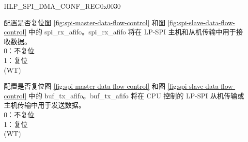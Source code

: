 \begin{register}{H}{LP\_SPI\_DMA\_CONF\_REG}{0x0030}\label{regdesc:LPSPIDMACONFREG}
%
%
%
%
\regnewline%
\begin{regdesc}\begin{reglist}
\label{fielddesc:LPSPIRXAFIFORST}\item [LP\_SPI\_RX\_AFIFO\_RST] 配置是否复位图 \ref{fig:spi-master-data-flow-control} 和图 \ref{fig:spi-slave-data-flow-control} 中的 spi\_rx\_afifo。spi\_rx\_afifo 将在 LP-SPI 主机和从机传输中用于接收数据。 \\
0：不复位\\
1：复位 \\
(WT)
\label{fielddesc:LPSPIBUFAFIFORST}\item [LP\_SPI\_BUF\_AFIFO\_RST] 配置是否复位图 \ref{fig:spi-master-data-flow-control} 和图 \ref{fig:spi-slave-data-flow-control} 中的 buf\_tx\_afifo。buf\_tx\_afifo 将在 CPU 控制的 LP-SPI 从机传输或主机传输中用于发送数据。\\
0：不复位\\
1：复位 \\
(WT)
\end{reglist}\end{regdesc}
\end{register}



